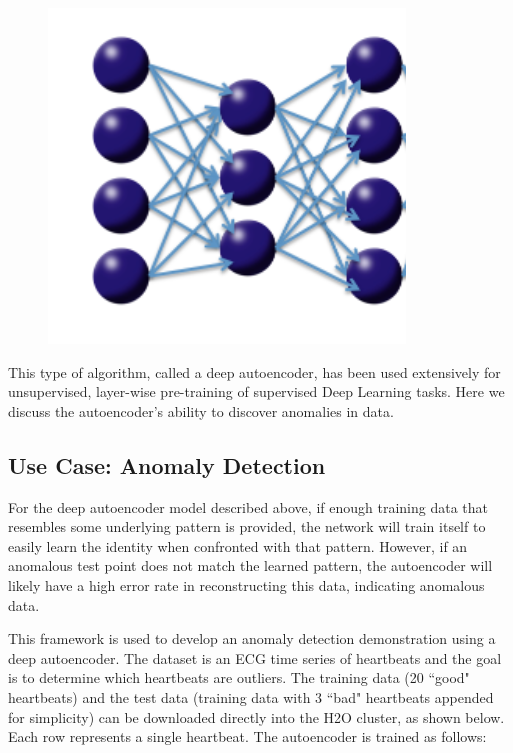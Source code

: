 {{\begin{figure}[h!]
\centering
\includegraphics[scale=0.6]{autoencoder.png}
\end{figure}

This type of algorithm, called a deep autoencoder, has been used extensively for unsupervised, layer-wise pre-training of supervised Deep Learning tasks. Here we discuss the autoencoder's ability to discover anomalies in data. 



\subsection{Use Case: Anomaly Detection} %
For the deep autoencoder model described above, if enough training data that resembles some underlying pattern is provided, the network will train itself to easily learn the identity when confronted with that pattern. However, if an anomalous test point does not match the learned pattern, the autoencoder will likely have a high error rate in reconstructing this data, indicating anomalous data.

This framework is used to develop an anomaly detection demonstration using a deep autoencoder. The dataset is an ECG time series of heartbeats and the goal is to determine which heartbeats are outliers. The training data (20 ``good" heartbeats) and the test data (training data with 3 ``bad" heartbeats appended for simplicity) can be downloaded directly into the H2O cluster, as shown below.  Each row represents a single heartbeat. The autoencoder is trained as follows: 

}}
